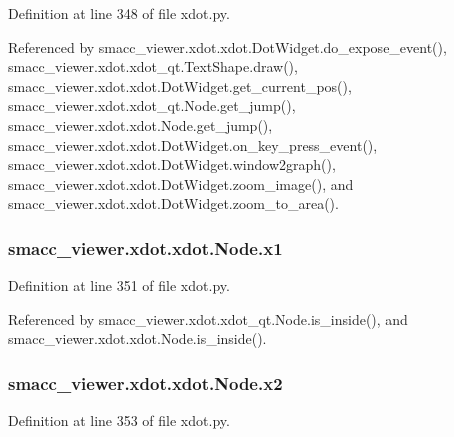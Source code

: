 Definition at line 348 of file xdot.\+py.



Referenced by smacc\+\_\+viewer.\+xdot.\+xdot.\+Dot\+Widget.\+do\+\_\+expose\+\_\+event(), smacc\+\_\+viewer.\+xdot.\+xdot\+\_\+qt.\+Text\+Shape.\+draw(), smacc\+\_\+viewer.\+xdot.\+xdot.\+Dot\+Widget.\+get\+\_\+current\+\_\+pos(), smacc\+\_\+viewer.\+xdot.\+xdot\+\_\+qt.\+Node.\+get\+\_\+jump(), smacc\+\_\+viewer.\+xdot.\+xdot.\+Node.\+get\+\_\+jump(), smacc\+\_\+viewer.\+xdot.\+xdot.\+Dot\+Widget.\+on\+\_\+key\+\_\+press\+\_\+event(), smacc\+\_\+viewer.\+xdot.\+xdot.\+Dot\+Widget.\+window2graph(), smacc\+\_\+viewer.\+xdot.\+xdot.\+Dot\+Widget.\+zoom\+\_\+image(), and smacc\+\_\+viewer.\+xdot.\+xdot.\+Dot\+Widget.\+zoom\+\_\+to\+\_\+area().

\subsubsection[{\texorpdfstring{x1}{x1}}]{\setlength{\rightskip}{0pt plus 5cm}smacc\+\_\+viewer.\+xdot.\+xdot.\+Node.\+x1}\hypertarget{classsmacc__viewer_1_1xdot_1_1xdot_1_1Node_a8cbebc88246c7e6ce8f45d02ba34637f}{}\label{classsmacc__viewer_1_1xdot_1_1xdot_1_1Node_a8cbebc88246c7e6ce8f45d02ba34637f}


Definition at line 351 of file xdot.\+py.



Referenced by smacc\+\_\+viewer.\+xdot.\+xdot\+\_\+qt.\+Node.\+is\+\_\+inside(), and smacc\+\_\+viewer.\+xdot.\+xdot.\+Node.\+is\+\_\+inside().

\subsubsection[{\texorpdfstring{x2}{x2}}]{\setlength{\rightskip}{0pt plus 5cm}smacc\+\_\+viewer.\+xdot.\+xdot.\+Node.\+x2}\hypertarget{classsmacc__viewer_1_1xdot_1_1xdot_1_1Node_ab9a94d7f15287ea05b88003631ff6cbe}{}\label{classsmacc__viewer_1_1xdot_1_1xdot_1_1Node_ab9a94d7f15287ea05b88003631ff6cbe}


Definition at line 353 of file xdot.\+py.



